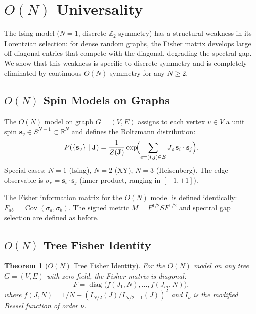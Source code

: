\documentclass[11pt]{article}
\newtheorem{theorem}{Theorem}[section]
\theoremstyle{definition}
\theoremstyle{remark}
\newcommand{\Fish}{F}
\newcommand{\sgn}{S}
\newcommand{\Met}{M}
\newcommand{\coupl}{\mathbf{J}}
\newcommand{\partf}{Z}
\newcommand{\Cov}{\operatorname{Cov}}
\newcommand{\diag}{\operatorname{diag}}
\newcommand{\edgeo}{\sigma}
\begin{document}
\section{$O(N)$ Universality}
\label{sec:on-universality}

The Ising model ($N = 1$, discrete $\mathbb{Z}_2$ symmetry) has a
structural weakness in its Lorentzian selection: for dense random
graphs, the Fisher matrix develops large off-diagonal entries that
compete with the diagonal, degrading the spectral gap. We show that
this weakness is specific to discrete symmetry and is completely
eliminated by continuous $O(N)$ symmetry for any $N \geq 2$.

\subsection{$O(N)$ Spin Models on Graphs}
\label{subsec:on-models}

The $O(N)$ model on graph $G = (V, E)$ assigns to each vertex $v \in V$
a unit spin $\mathbf{s}_v \in S^{N-1} \subset \mathbb{R}^N$ and defines
the Boltzmann distribution:
\begin{equation}
  P(\{\mathbf{s}_v\} \mid \coupl)
  = \frac{1}{\partf(\coupl)} \exp\!\Bigl(
    \sum_{e=(i,j) \in E} J_e \, \mathbf{s}_i \cdot \mathbf{s}_j
  \Bigr).
  \label{eq:on-model}
\end{equation}
Special cases: $N = 1$ (Ising), $N = 2$ (XY), $N = 3$ (Heisenberg).
The edge observable is $\edgeo_e = \mathbf{s}_i \cdot \mathbf{s}_j$
(inner product, ranging in $[-1, +1]$).

The Fisher information matrix for the $O(N)$ model is defined identically:
$\Fish_{ab} = \Cov(\edgeo_a, \edgeo_b)$. The signed metric
$\Met = \Fish^{1/2}\sgn\Fish^{1/2}$ and spectral gap selection are
defined as before.

\subsection{$O(N)$ Tree Fisher Identity}
\label{subsec:on-tree-fisher}

\begin{theorem}[$O(N)$ Tree Fisher Identity]
\label{thm:on-tree-fisher}
For the $O(N)$ model on any tree $G = (V, E)$ with zero field,
the Fisher matrix is diagonal:
\begin{equation}
  \Fish = \diag\bigl(f(J_1, N), \ldots, f(J_m, N)\bigr),
  \label{eq:on-tree-fisher}
\end{equation}
where $f(J, N) = 1/N - (I_{N/2}(J)/I_{N/2-1}(J))^2$ and $I_\nu$ is the
modified Bessel function of order $\nu$.
\end{theorem}
\end{document}
